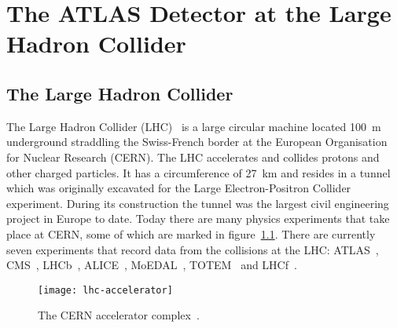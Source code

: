  \chapter{The ATLAS Detector at the Large Hadron Collider}%
\label{ch:detector}

\section{The Large Hadron Collider}%
\label{sec:lhc}%
The Large Hadron Collider (LHC)~\cite{LHC-dr} is a large circular machine
located 100~m underground straddling the Swiss-French border at the European
Organisation for Nuclear Research (CERN). The LHC accelerates and collides
protons and other charged particles. It has a circumference of 27~km and resides
in a tunnel which was originally excavated for the Large Electron-Positron
Collider~\cite{LEP} experiment. During its construction the tunnel was the
largest civil engineering project in Europe to date. Today there are many
physics experiments that take place at CERN, some of which are marked in
figure~\ref{fig:lhc-acc}. There are currently seven experiments that record
data from the collisions at the LHC: ATLAS~\cite{ATLAS-loi}, CMS~\cite{CMS-loi},
LHCb~\cite{lhcb-loi}, ALICE~\cite{ALICE-loi}, MoEDAL~\cite{MoEDAL-loi},
TOTEM~\cite{TOTEM-loi} and LHCf~\cite{lhcf-loi}.
\begin{figure}[ht]
  \centering
  \texttt{[image: lhc-accelerator]}
  \caption[The CERN accelerator complex]{The CERN accelerator
    complex~\cite{LHC-acc-fig}.}%
  \label{fig:lhc-acc}
\end{figure}


